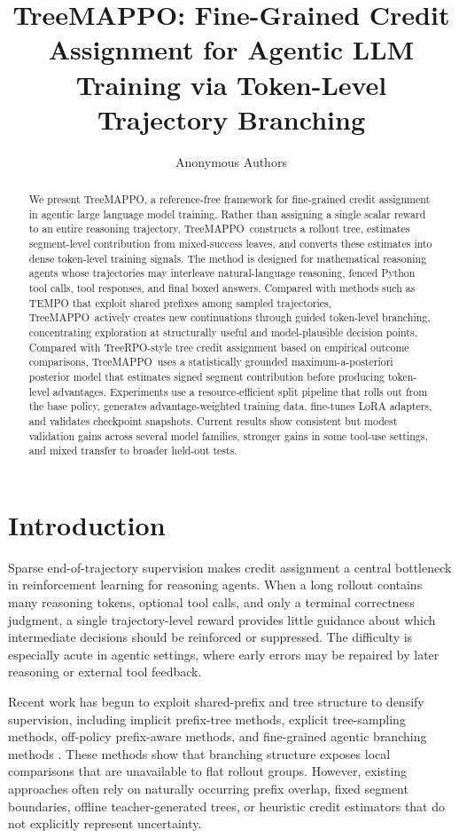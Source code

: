 \documentclass{article}
\title{TreeMAPPO: Fine-Grained Credit Assignment for Agentic LLM Training via Token-Level Trajectory Branching}
\author{Anonymous Authors}
\newcommand{\ours}{TreeMAPPO}
\begin{document}
\maketitle

\begin{abstract}
We present \ours, a reference-free framework for fine-grained credit assignment in agentic large language model training. Rather than assigning a single scalar reward to an entire reasoning trajectory, \ours\ constructs a rollout tree, estimates segment-level contribution from mixed-success leaves, and converts these estimates into dense token-level training signals. The method is designed for mathematical reasoning agents whose trajectories may interleave natural-language reasoning, fenced Python tool calls, tool responses, and final boxed answers. Compared with methods such as TEMPO that exploit shared prefixes among sampled trajectories, \ours\ actively creates new continuations through guided token-level branching, concentrating exploration at structurally useful and model-plausible decision points. Compared with TreeRPO-style tree credit assignment based on empirical outcome comparisons, \ours\ uses a statistically grounded maximum-a-posteriori posterior model that estimates signed segment contribution before producing token-level advantages. Experiments use a resource-efficient split pipeline that rolls out from the base policy, generates advantage-weighted training data, fine-tunes LoRA adapters, and validates checkpoint snapshots. Current results show consistent but modest validation gains across several model families, stronger gains in some tool-use settings, and mixed transfer to broader held-out tests.
\end{abstract}

\section{Introduction}
Sparse end-of-trajectory supervision makes credit assignment a central bottleneck in reinforcement learning for reasoning agents. When a long rollout contains many reasoning tokens, optional tool calls, and only a terminal correctness judgment, a single trajectory-level reward provides little guidance about which intermediate decisions should be reinforced or suppressed. The difficulty is especially acute in agentic settings, where early errors may be repaired by later reasoning or external tool feedback.

Recent work has begun to exploit shared-prefix and tree structure to densify supervision, including implicit prefix-tree methods, explicit tree-sampling methods, off-policy prefix-aware methods, and fine-grained agentic branching methods \cite{tempo2025,treerpo2025,treepo2025,treeopo2025,appo2026}. These methods show that branching structure exposes local comparisons that are unavailable to flat rollout groups. However, existing approaches often rely on naturally occurring prefix overlap, fixed segment boundaries, offline teacher-generated trees, or heuristic credit estimators that do not explicitly represent uncertainty.
\end{document}
